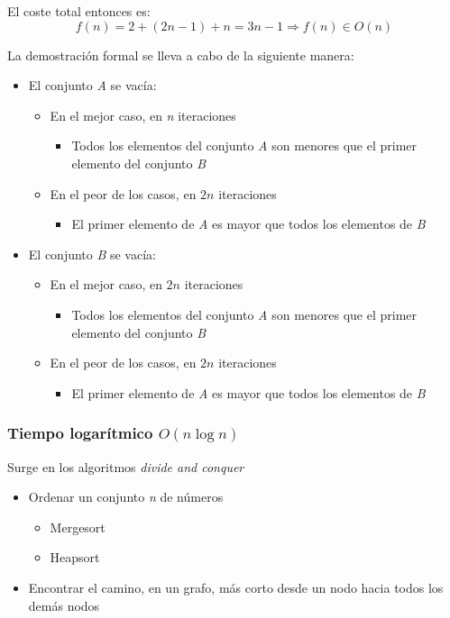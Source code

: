 \documentclass[letterpaper, 12pt]{article}
\begin{document}
\begin{itemize}
El coste total entonces es:
$$
    f(n) = 2 + (2n - 1) + n = 3n - 1 \Rightarrow f(n) \in O(n)
    $$

La demostración formal se lleva a cabo de la siguiente manera:
\begin{itemize}
\item El conjunto \emph{A} se vacía:
\begin{itemize}
\item En el mejor caso, en \emph{n} iteraciones
\begin{itemize}
\item Todos los elementos del conjunto \emph{A} son menores que el primer
elemento del conjunto \emph{B}
\end{itemize}
\item En el peor de los casos, en \(2n\) iteraciones
\begin{itemize}
\item El primer elemento de \emph{A} es mayor que todos los elementos de \emph{B}
\end{itemize}
\end{itemize}
\item El conjunto \emph{B} se vacía:
\begin{itemize}
\item En el mejor caso, en \(2n\) iteraciones
\begin{itemize}
\item Todos los elementos del conjunto \emph{A} son menores que el primer
elemento del conjunto \emph{B}
\end{itemize}
\item En el peor de los casos, en \(2n\) iteraciones
\begin{itemize}
\item El primer elemento de \emph{A} es mayor que todos los elementos de \emph{B}
\end{itemize}
\end{itemize}
\end{itemize}
\end{itemize}
\subsubsection{Tiempo logarítmico \(O(n \log n)\)}
\label{sec:org5ad5361}
Surge en los algoritmos \emph{divide and conquer}
\begin{itemize}
\item Ordenar un conjunto \emph{n} de números
\begin{itemize}
\item Mergesort
\item Heapsort
\end{itemize}
\item Encontrar el camino, en un grafo, más corto desde un nodo hacia todos los
demás nodos
\end{itemize}
\end{document}
